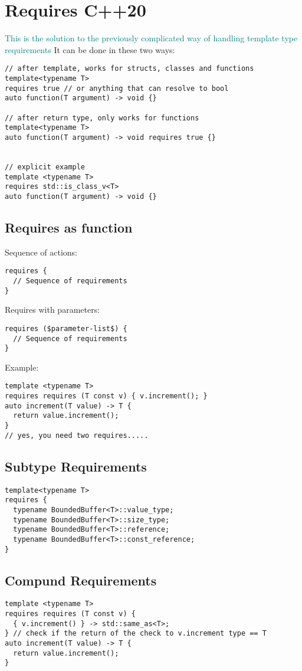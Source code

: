 \documentclass[main.tex,fontsize=8pt,paper=a4,paper=portrait,DIV=calc,]{scrartcl}
\begin{document}
\section{Requires C++20}
\textcolor{teal}{This is the solution to the previously complicated way of handling template type requirements}\newline
It can be done in these two ways:
\begin{lstlisting}
// after template, works for structs, classes and functions
template<typename T>
requires true // or anything that can resolve to bool
auto function(T argument) -> void {}

// after return type, only works for functions
template<typename T>
auto function(T argument) -> void requires true {} 


// explicit example
template <typename T>
requires std::is_class_v<T>
auto function(T argument) -> void {}
\end{lstlisting}

\subsection{Requires as function}
Sequence of actions: 
\begin{lstlisting}
requires {
  // Sequence of requirements
}
\end{lstlisting}
Requires with parameters:
\begin{lstlisting}
requires ($parameter-list$) {
  // Sequence of requirements
}
\end{lstlisting}
Example: 
\begin{lstlisting}
template <typename T>
requires requires (T const v) { v.increment(); }
auto increment(T value) -> T {
  return value.increment();
}
// yes, you need two requires.....
\end{lstlisting}

\subsection{Subtype Requirements}
\begin{lstlisting}
template<typename T>
requires {
  typename BoundedBuffer<T>::value_type;
  typename BoundedBuffer<T>::size_type;
  typename BoundedBuffer<T>::reference;
  typename BoundedBuffer<T>::const_reference;
}
\end{lstlisting}

\subsection{Compund Requirements}
\begin{lstlisting}
template <typename T>
requires requires (T const v) {
  { v.increment() } -> std::same_as<T>;
} // check if the return of the check to v.increment type == T
auto increment(T value) -> T {
  return value.increment();
}
\end{lstlisting}
\end{document}
